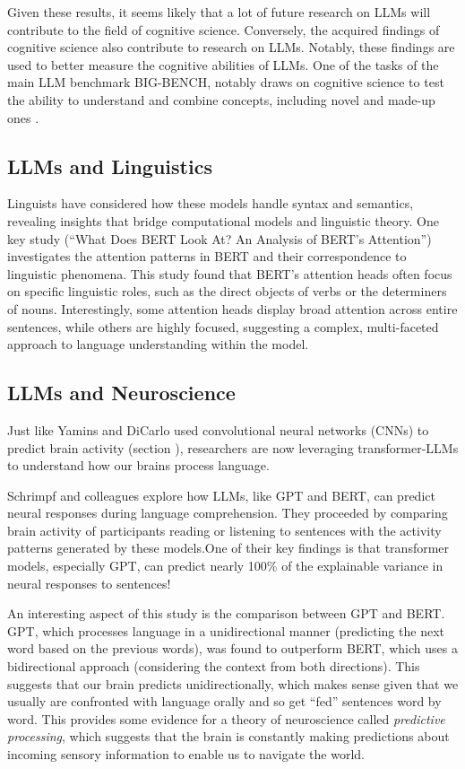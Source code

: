 Given these results, it seems likely that a lot of future research on LLMs will contribute to the field of cognitive science. Conversely, the acquired findings of cognitive science also contribute to research on LLMs. Notably, these findings are used to better measure the cognitive abilities of LLMs. One of the tasks of the main LLM benchmark BIG-BENCH, notably draws on cognitive science to test the ability to understand and combine concepts, including novel and made-up ones \cite{srivastava2022beyond}.

\subsection{LLMs and Linguistics}

Linguists have considered how these models handle syntax and semantics, revealing insights that bridge computational models and linguistic theory. One key study (``What Does BERT Look At? An Analysis of BERT's Attention'') investigates the attention patterns in BERT and their correspondence to linguistic phenomena. This study found that BERT's attention heads often focus on specific linguistic roles, such as the direct objects of verbs or the determiners of nouns. Interestingly, some attention heads display broad attention across entire sentences, while others are highly focused, suggesting a complex, multi-faceted approach to language understanding within the model. 

\subsection{LLMs and Neuroscience}

Just like Yamins and DiCarlo used convolutional neural networks (CNNs) to predict brain activity (section ), researchers are now leveraging transformer-LLMs to understand how our brains process language. 

Schrimpf and colleagues \cite{schrimpf2021neural} explore how LLMs, like GPT and BERT, can predict neural responses during language comprehension. They proceeded by comparing  brain activity of participants reading or listening to sentences with the activity patterns generated by these models.One of their key findings is that transformer models, especially GPT, can predict nearly 100\% of the explainable variance in neural responses to sentences! 

An interesting aspect of this study is the comparison between GPT and BERT. GPT, which processes language in a unidirectional manner (predicting the next word based on the previous words), was found to outperform BERT, which uses a bidirectional approach (considering the context from both directions). This suggests that our brain predicts unidirectionally, which  makes sense given that we usually are confronted with language orally and so get ``fed'' sentences word by word. This provides some evidence for a theory of neuroscience called \emph{predictive processing}, which suggests that the brain is constantly making predictions about incoming sensory information to enable us to navigate the world.

